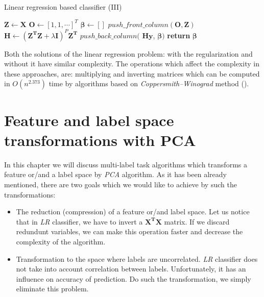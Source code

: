 \begin{algorithm}
    \caption{Linear regression based classifier (III)}\label{alg:LR2}
    \begin{algorithmic}[1]
        \State $\boldsymbol{Z} \gets \boldsymbol{X}$ 
        \State $\boldsymbol{O} \gets [1, 1, \cdots]^T$ 
        \State $\boldsymbol{\beta} \gets []$
        \State $push\_front\_column(\boldsymbol{O}, \boldsymbol{Z})$
        \State $\boldsymbol{H} \gets (\boldsymbol{Z^T}\boldsymbol{Z}+\lambda\boldsymbol{I})^P\boldsymbol{Z^T}$
            \State $push\_back\_column($ $\boldsymbol{H}\boldsymbol{y}$, $\boldsymbol{\beta})$ 
        \EndFor
        \State \textbf{return} $\boldsymbol{\beta}$
    \EndProcedure
    \end{algorithmic}
\end{algorithm}

Both the solutions of the linear regression problem: with the regularization and without it have similar complexity. The operations which affect the complexity in these approaches, are: multiplying and inverting matrices which can be computed in $O(n^{2.373})$ time by algorithms based on \textit{Coppersmith–Winograd} method (\cite{VVW}). 

\section{Feature and label space transformations with PCA}

In this chapter we will discuss multi-label task algorithms which transforms a feature or/and a label space by \textit{PCA} algorithm. As it has been already mentioned, there are two goals which we would like to achieve by such the transformations:
\begin{itemize}
    \item The reduction (compression) of a feature or/and label space. Let us notice that in \textit{LR} classifier, we have to invert a $\boldsymbol{X^T}\boldsymbol{X}$ matrix. If we discard redundunt variables, we can make this operation faster and decrease the complexity of the algorithm.
    \item Transformation to the space where labels are uncorrelated. \textit{LR} classifier does not take into account correlation between labels. Unfortunately, it has an influence on accuracy of prediction. Do such the transformation, we simply eliminate this problem. 
\end{itemize}


